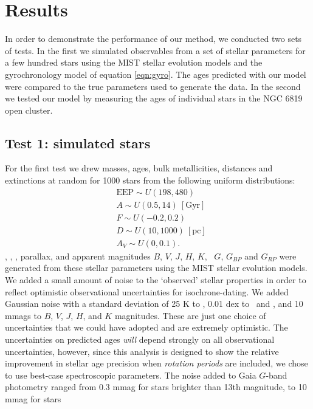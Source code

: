\section{Results}
\label{section:results}

In order to demonstrate the performance of our method, we conducted two sets
of tests.
In the first we simulated observables from a set of stellar parameters for a
few hundred stars using the MIST stellar evolution models and the
gyrochronology model of equation \ref{eqn:gyro}.
The ages predicted with our model were compared to the true parameters used to
generate the data.
In the second we tested our model by measuring the ages of individual stars in
the NGC 6819 open cluster.

\subsection{Test 1: simulated stars}
For the first test we drew masses, ages, bulk metallicities, distances and
extinctions at random for 1000 stars from the following uniform distributions:
\begin{eqnarray}
& \mathrm{EEP} \sim U(198, 480) \\
& A \sim U(0.5, 14)\mathrm{~[Gyr]} \\
& F \sim U(-0.2, 0.2) \\
& D \sim U(10, 1000)~\mathrm{[pc]} \\
& A_V \sim U(0, 0.1).
\end{eqnarray}
\teff, \logg, \fhat, parallax, and apparent magnitudes $B$, $V$, $J$, $H$, $K$,
\gaia\ $G$, $G_{BP}$ and $G_{RP}$ were generated from these
stellar parameters using the MIST stellar evolution models.
We added a small amount of noise to the `observed' stellar properties in order
to reflect optimistic observational uncertainties for isochrone-dating.
We added Gaussian noise with a standard deviation of 25 K to \teff, 0.01 dex
to \feh\ and \logg, and 10 mmags to $B$, $V$, $J$, $H$, and $K$ magnitudes.
These are just one choice of uncertainties that we could have adopted and are
extremely optimistic.
The uncertainties on predicted ages {\it will} depend strongly on all
observational uncertainties, however, since this analysis is designed to show
the relative improvement in stellar age precision when {\it rotation periods}
are included, we chose to use best-case spectroscopic parameters.
The noise added to Gaia $G$-band photometry ranged from
0.3 mmag for stars brighter than 13th magnitude, to 10 mmag for stars
